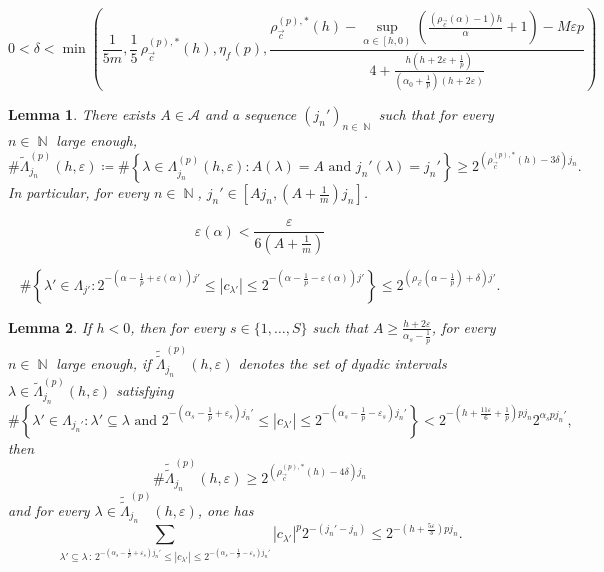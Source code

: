 \documentclass[10pt,a4paper]{amsart}
\newtheorem{lemma}{Lemma}
\DeclareMathOperator{\N}{\mathbb{N}}
\newcommand{\ccint}[1]{\left[{#1}\right]}
\newcommand{\coint}[1]{\left[{#1}\right)}
\newcommand{\modu}[1]{\left\vert{#1}\right\vert}
\begin{document}
\begin{equation}\label{eq:delta}
    0<\delta<\min\left(\frac{1}{5m},\frac{1}{5}\,\rho_{\vec{c}}^{(p),\ast}(h),\eta_f(p),\frac{\rho^{(p),\ast}_{\vec{c}}(h)-\displaystyle\sup_{\alpha\in\coint{h,0}}\left(\frac{(\rho_{\vec{c}}(\alpha)-1)h}{\alpha}+1\right)-M\varepsilon p}{4+\frac{h\left(h+2\varepsilon+\frac{1}{p}\right)}{\left(\alpha_0+\frac{1}{p}\right)(h+2\varepsilon)}}\right) 
\end{equation}

\begin{lemma}\label{lm:card_Lambdap}
    There exists $A\in\mathcal{A}$ and a sequence $(j_n')_{n\in\N}$ such that for every $n\in\N$ large enough,
    \[
        \#\widetilde{\Lambda}_{j_n}^{(p)}(h,\varepsilon) \coloneqq \#\left\{\lambda\in\Lambda_{j_n}^{(p)}(h,\varepsilon):A(\lambda)=A \text{ and }j_n'(\lambda)=j_n'\right\} \geq 2^{\left(\rho_{\vec{c}}^{(p),\ast}(h)-3\delta\right)j_n}.
    \]
    In particular, for every $n\in\N$, $j_n'\in\ccint{Aj_n,\left(A+\frac{1}{m}\right)j_n}$.
\end{lemma}

\begin{equation}\label{eq:epsilon_s1}
    \varepsilon(\alpha)<\frac{\varepsilon}{6\left(A+\frac{1}{m}\right)}
\end{equation}

\begin{equation}\label{eq:epsilon_s2}
    \#\left\{\lambda'\in\Lambda_{j'}:2^{-\left(\alpha-\frac{1}{p}+\varepsilon(\alpha)\right)j'} \leq \modu{c_{\lambda'}} \leq 2^{-\left(\alpha-\frac{1}{p}-\varepsilon(\alpha)\right)j'}\right\} \leq 2^{\left(\rho_{\vec{c}}\left(\alpha-\frac{1}{p}\right)+\delta\right)j'}.
\end{equation}

\begin{lemma}\label{lm:rid_order2}
    If $h<0$, then for every $s\in\{1,\ldots,S\}$ such that $A\geq\frac{h+2\varepsilon}{\alpha_s-\frac{1}{p}}$, for every $n\in\N$ large enough, if $\widetilde{\widetilde{\Lambda}}_{j_n}^{(p)}(h,\varepsilon)$ denotes the set of dyadic intervals $\lambda\in\widetilde{\Lambda}_{j_n}^{(p)}(h,\varepsilon)$ satisfying
    \[
    \#\left\{\lambda'\in\Lambda_{j_n'}:\lambda'\subseteq\lambda  \text{ and } 2^{-\left(\alpha_s-\frac{1}{p}+\varepsilon_s\right)j_n'} \leq \modu{c_{\lambda'}} \leq 2^{-\left(\alpha_s-\frac{1}{p}-\varepsilon_s\right)j_n'}\right\}<2^{-\left(h+\frac{11\varepsilon}{6}+\frac{1}{p}\right)pj_n}2^{\alpha_spj_n'},
    \]
    then
    \[
    \#\widetilde{\widetilde{\Lambda}}_{j_n}^{(p)}(h,\varepsilon) \geq 2^{\left(\rho_{\vec{c}}^{(p),\ast}(h)-4\delta\right)j_n}
    \]
    and for every $\lambda\in\widetilde{\widetilde{\Lambda}}_{j_n}^{(p)}(h,\varepsilon)$, one has
    \[
    \sum_{\lambda'\subseteq\lambda \,:\, 2^{-\left(\alpha_s-\frac{1}{p}+\varepsilon_s\right)j_n'} \leq \modu{c_{\lambda'}} \leq 2^{-\left(\alpha_s-\frac{1}{p}-\varepsilon_s\right)j_n'}} \modu{c_{\lambda'}}^p2^{-(j_n'-j_n)} \leq 2^{-\left(h+\frac{5\varepsilon}{3}\right)pj_n}.
    \]
\end{lemma}
\end{document}
